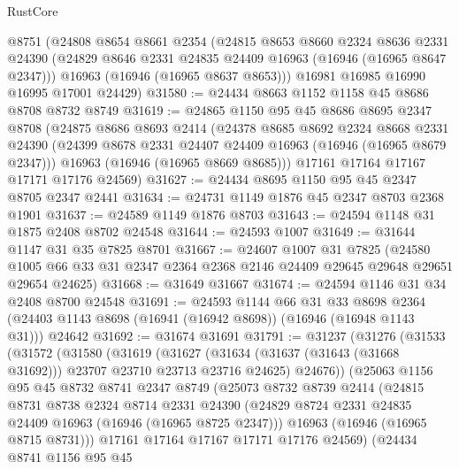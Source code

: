 \begin{lexlean}{RustCore}
\begin{coremodule}
    @8751
    (@24808
      @8654
      @8661
      @2354
      (@24815
        @8653
        @8660
        @2324
        @8636
        @2331
        @24390
        (@24829 @8646 @2331 @24835 @24409 @16963 (@16946 (@16965 @8647 @2347)))
        @16963
        (@16946 (@16965 @8637 @8653)))
      @16981
      @16985
      @16990
      @16995
      @17001
      @24429)
@31580 := @24434 @8663 @1152 @1158 @45 @8686 @8708 @8732 @8749
@31619 := @24865
    @1150
    @95
    @45
    @8686
    @8695
    @2347
    @8708
    (@24875
      @8686
      @8693
      @2414
      (@24378
        @8685
        @8692
        @2324
        @8668
        @2331
        @24390
        (@24399 @8678 @2331 @24407 @24409 @16963 (@16946 (@16965 @8679 @2347)))
        @16963
        (@16946 (@16965 @8669 @8685)))
      @17161
      @17164
      @17167
      @17171
      @17176
      @24569)
@31627 := @24434 @8695 @1150 @95 @45 @2347 @8705 @2347 @2441
@31634 := @24731 @1149 @1876 @45 @2347 @8703 @2368 @1901
@31637 := @24589 @1149 @1876 @8703
@31643 := @24594 @1148 @31 @1875 @2408 @8702 @24548
@31644 := @24593 @1007
@31649 := @31644 @1147 @31 @35 @7825 @8701
@31667 := @24607
    @1007
    @31
    @7825
    (@24580 @1005 @66 @33 @31 @2347 @2364 @2368 @2146 @24409 @29645 @29648 @29651 @29654 @24625)
@31668 := @31649 @31667
@31674 := @24594 @1146 @31 @34 @2408 @8700 @24548
@31691 := @24593
    @1144
    @66
    @31
    @33
    @8698
    @2364
    (@24403 @1143 @8698 (@16941 (@16942 @8698)) (@16946 (@16948 @1143 @31)))
    @24642
@31692 := @31674 @31691
@31791 := @31237
    (@31276
      (@31533
        (@31572
          (@31580
            (@31619
              (@31627
                (@31634 (@31637 (@31643 (@31668 @31692))) @23707 @23710 @23713 @23716 @24625)
                @24676))
            (@25063
              @1156
              @95
              @45
              @8732
              @8741
              @2347
              @8749
              (@25073
                @8732
                @8739
                @2414
                (@24815
                  @8731
                  @8738
                  @2324
                  @8714
                  @2331
                  @24390
                  (@24829 @8724 @2331 @24835 @24409 @16963 (@16946 (@16965 @8725 @2347)))
                  @16963
                  (@16946 (@16965 @8715 @8731)))
                @17161
                @17164
                @17167
                @17171
                @17176
                @24569)
              (@24434
                @8741
                @1156
                @95
                @45

\end{coremodule}
\end{lexlean}

